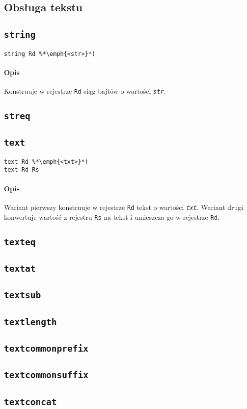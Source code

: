 \subsection{Obsługa tekstu}
\label{viua_vm_ops_text}

\subsection{\texttt{string}}

\begin{lstlisting}
string Rd %*\emph{<str>}*)
\end{lstlisting}

\paragraph*{Opis} Konstruuje w rejestrze \texttt{Rd} ciąg bajtów o wartości \emph{\texttt{str}}.

\subsection{\texttt{streq}}

\subsection{\texttt{text}}

\begin{lstlisting}
text Rd %*\emph{<txt>}*)
text Rd Rs
\end{lstlisting}

\paragraph*{Opis} Wariant pierwszy konstruuje w rejestrze \texttt{Rd} tekst o wartości \emph{\texttt{txt}}.
Wariant drugi konwertuje wartość z rejestru \texttt{Rs} na tekst i umieszcza go w rejestrze \texttt{Rd}.

\subsection{\texttt{texteq}}
\subsection{\texttt{textat}}
\subsection{\texttt{textsub}}
\subsection{\texttt{textlength}}
\subsection{\texttt{textcommonprefix}}
\subsection{\texttt{textcommonsuffix}}
\subsection{\texttt{textconcat}}
